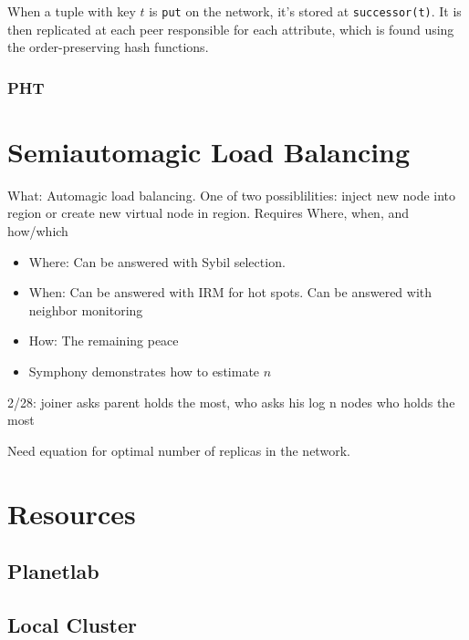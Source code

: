 When a tuple with key $t$ is \texttt{put} on the network, it's stored at \texttt{successor(t)}.  It is then replicated at each peer responsible for each attribute, which is found using the order-preserving hash functions.


\subsubsection*{PHT}


\section{Semiautomagic Load Balancing}
What: Automagic load balancing.  One of two possiblilities:  inject new node into region or create new virtual node in region. 
Requires Where, when, and how/which

\begin{itemize}
    \item Where: Can be answered with Sybil selection.
    \item When:  Can be answered with IRM for hot spots.  Can be answered with neighbor monitoring
    \item How:  The remaining peace
    \item Symphony demonstrates how to estimate $n$
\end{itemize}

2/28: joiner asks parent holds the most, who asks his log n nodes who holds the most


Need equation for optimal number of replicas in the network.

\section{Resources}
\subsection{Planetlab}
\subsection{Local Cluster}
